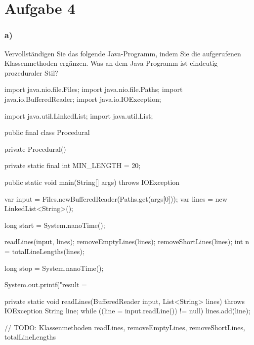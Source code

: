 \chapter{Aufgabe 4}
\label{sec:aufgabe4}

\subsection*{a)}
Vervollständigen Sie das folgende Java-Programm, indem Sie die aufgerufenen Klassenmethoden ergänzen.
Was an dem Java-Programm ist eindeutig prozeduraler Stil?
\newline
\begin{code}[language=java, caption={Vorgabe}, label={lst:Aufgabe4a}]
import java.nio.file.Files;
import java.nio.file.Paths;
import java.io.BufferedReader;
import java.io.IOException;

import java.util.LinkedList;
import java.util.List;

public final class Procedural {
    private Procedural() { }

    private static final int MIN_LENGTH = 20;

    public static void main(String[] args) throws IOException {
        var input = Files.newBufferedReader(Paths.get(args[0]));
        var lines = new LinkedList<String>();

        long start = System.nanoTime();

        readLines(input, lines);
        removeEmptyLines(lines);
        removeShortLines(lines);
        int n = totalLineLengths(lines);

        long stop = System.nanoTime();

        System.out.printf("result = %
    }

    private static void readLines(BufferedReader input, List<String> lines) throws IOException {
        String line;
        while ((line = input.readLine()) != null) {
            lines.add(line);
        }
    }

    // TODO: Klassenmethoden readLines, removeEmptyLines, removeShortLines, totalLineLengths
}
\end{code}
\newline

